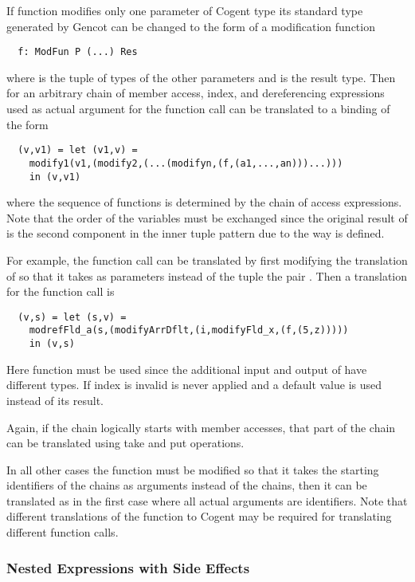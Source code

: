 If function  modifies only one parameter  of Cogent type  its standard type generated by
Gencot can be changed to the form of a modification function
\begin{verbatim}
  f: ModFun P (...) Res
\end{verbatim}
where  is the tuple of types of the other parameters and  is the result type. Then for an arbitrary
chain of member access, index, and dereferencing expressions used as actual argument for  the function call 
can be translated to a binding of the form
\begin{verbatim}
  (v,v1) = let (v1,v) = 
    modify1(v1,(modify2,(...(modifyn,(f,(a1,...,an)))...)))
    in (v,v1)
\end{verbatim}
where the sequence of  functions is determined by the chain of access expressions. Note
that the order of the variables must be exchanged since the original result of  is the second component in 
the inner tuple pattern due to the way  is defined.

For example, the function call  can be translated by first modifying the translation of 
 so that it takes as parameters instead of the tuple  the pair . Then a translation
for the function call is
\begin{verbatim}
  (v,s) = let (s,v) = 
    modrefFld_a(s,(modifyArrDflt,(i,modifyFld_x,(f,(5,z)))))
    in (v,s)
\end{verbatim}
Here function  must be used since the additional input and output of  have different types.
If index  is invalid  is never applied and a default value is used instead of its result.

Again, if the chain logically starts with member accesses, that part of the chain can be translated using take and put operations.

In all other cases the function  must be modified so that it takes the starting identifiers of the chains as
arguments instead of the chains, then it can be translated as in the first case where all actual arguments are identifiers.
Note that different translations of the function to Cogent may be required for translating different function calls.

\subsubsection{Nested Expressions with Side Effects}


